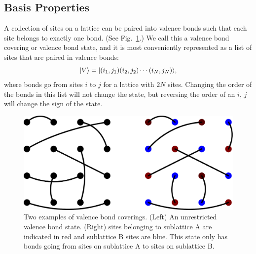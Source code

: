 \subsection{Basis Properties}
A collection of sites on a lattice can be paired into valence bonds such that each site
belongs to exactly one bond. (See Fig.~\ref{covering}.)  
We call this a valence bond covering or valence bond state, and it is most conveniently represented as a list of 
sites that are paired in valence bonds:
\begin{equation}
	\lvert {V} \rangle = \lvert {(i_1,j_1)(i_2,j_2)\cdots(i_N,j_N)} \rangle,
\end{equation}
where bonds go from sites $i$ to $j$ for a lattice with $2N$ sites.  
Changing the order of the bonds in this list will not change the state, but reversing the order of an
$i$, $j$ will change the sign of the state.

\begin{figure} { \includegraphics [width=5.5in]
{./figures/made/coverings.pdf}
\centering
 \caption[Two valence bond coverings]{
	Two examples of valence bond coverings.  (Left) An unrestricted valence bond state.
	(Right) sites belonging to sublattice A are indicated in red and sublattice B sites are blue.   	 	This state only has bonds going from  sites on sublattice A to sites on sublattice B.  
 }
\label{covering}
}
\end{figure}
 
